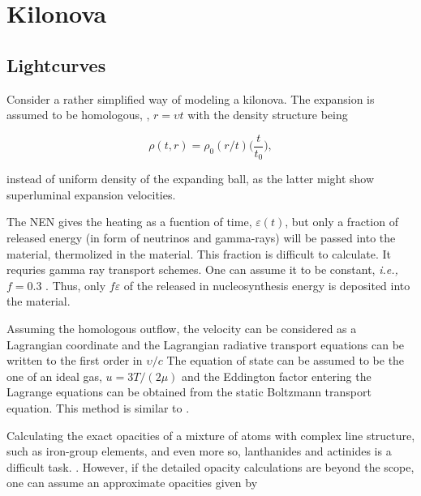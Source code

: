 
\chapter{Kilonova}
\label{app:mkn}


\section{Lightcurves}



Consider a rather simplified way of modeling a kilonova. 
The expansion is assumed to be homologous, \ie, $r = \upsilon t$ with the density structure being

\begin{equation}
\rho(t, r) = \rho_0(r/t)\Big(\frac{t}{t_0}\Big),
\end{equation}

instead of uniform density of the expanding ball, as the latter might show superluminal expansion velocities.

The \ac{NEN} gives the heating as a fucntion of time, $\varepsilon(t)$, but only a fraction of released energy (in form of neutrinos and gamma-rays) will be passed into the material, thermolized in the material. This fraction is difficult to calculate. It requries gamma ray transport schemes. One can assume it to be constant, \textit{i.e.,} $f=0.3$ \cite{Barnes:2013wka}. Thus, only $f\varepsilon$ of the released in nucleosynthesis energy is deposited into the material.

Assuming the homologous outflow, the velocity can be considered as a Lagrangian coordinate and the Lagrangian radiative transport equations can be written to the first order in $\upsilon/c$ \citep{Mihalas:1984}
The equation of state can be assumed to be the one of an ideal gas, $u=3T/(2\mu)$ and the Eddington factor entering the Lagrange equations can be obtained from the static Boltzmann transport equation. 
This method is similar to \citep{Ensman:1994}. 

Calculating the exact opacities of a mixture of atoms with complex line structure, such as iron-group elements, and even more so, lanthanides and actinides is a difficult task. .
However, if the detailed opacity calculations are beyond the scope, one can assume an approximate opacities given by 

